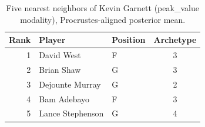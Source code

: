 \begin{table}[htbp]
  \centering\small
  \begin{tabular}{rllc}
    \toprule
    Rank & Player & Position & Archetype \\
    \midrule
    1 & David West & F & 3 \\
    2 & Brian Shaw & G & 3 \\
    3 & Dejounte Murray & G & 2 \\
    4 & Bam Adebayo & F & 3 \\
    5 & Lance Stephenson & G & 4 \\
    \bottomrule
  \end{tabular}
  \caption{Five nearest neighbors of Kevin Garnett (peak_value modality), Procrustes-aligned posterior mean.}
  \label{tab:Kevin_Garnett_neighbors_peak_value}
\end{table}

